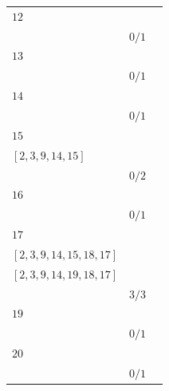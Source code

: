 \documentclass[12pt, a4paper]{extarticle}
\begin{document}
\begin{table}[h!]
\begin{tabularx}{\textwidth}{|X|X|X|}
        \hline
        $12$ & \begin{tabular}{@{}l@{}} $[2, 3, 9, 13, 12]$ \\ \end{tabular} & $0/1$ \\
        \hline
        $13$ & \begin{tabular}{@{}l@{}} $[2, 3, 9, 13]$ \\ \end{tabular} & $0/1$ \\
        \hline
        $14$ & \begin{tabular}{@{}l@{}} $[2, 3, 9, 14]$ \\ \end{tabular} & $0/1$ \\
        \hline
        $15$ & \begin{tabular}{@{}l@{}} $[2, 3, 9, 13, 15]$ \\  $[2, 3, 9, 14, 15]$ \\ \end{tabular} & $0/2$ \\
        \hline
        $16$ & \begin{tabular}{@{}l@{}} $[2, 3, 6, 10, 16]$ \\ \end{tabular} & $0/1$ \\
        \hline
        $17$ & \begin{tabular}{@{}l@{}} $[2, 3, 9, 13, 15, 18, 17]$ \\  $[2, 3, 9, 14, 15, 18, 17]$ \\  $[2, 3, 9, 14, 19, 18, 17]$ \\ \end{tabular} & $3/3$ \\
        \hline
        $19$ & \begin{tabular}{@{}l@{}} $[2, 3, 9, 14, 19]$ \\ \end{tabular} & $0/1$ \\
        \hline
        $20$ & \begin{tabular}{@{}l@{}} $[2, 3, 9, 14, 19, 20]$ \\ \end{tabular} & $0/1$ \\
        \hline
    \end{tabularx}
\end{table}
\end{document}
